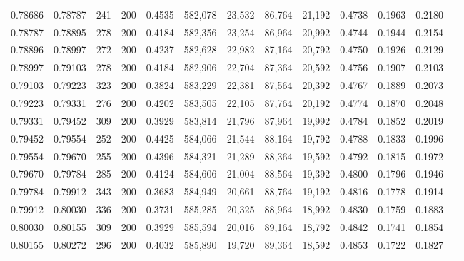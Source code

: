 \begin{tabular}{rrrrrrrrrrrrr}
0.78686 & 0.78787 &    241 & 200 &                                     0.4535 & 582,078 &  23,532 &  86,764 &  21,192 & 0.4738 & 0.1963 & 0.2180 \\
0.78787 & 0.78895 &    278 & 200 &                                     0.4184 & 582,356 &  23,254 &  86,964 &  20,992 & 0.4744 & 0.1944 & 0.2154 \\
0.78896 & 0.78997 &    272 & 200 &                                     0.4237 & 582,628 &  22,982 &  87,164 &  20,792 & 0.4750 & 0.1926 & 0.2129 \\
0.78997 & 0.79103 &    278 & 200 &                                     0.4184 & 582,906 &  22,704 &  87,364 &  20,592 & 0.4756 & 0.1907 & 0.2103 \\
0.79103 & 0.79223 &    323 & 200 &                                     0.3824 & 583,229 &  22,381 &  87,564 &  20,392 & 0.4767 & 0.1889 & 0.2073 \\
0.79223 & 0.79331 &    276 & 200 &                                     0.4202 & 583,505 &  22,105 &  87,764 &  20,192 & 0.4774 & 0.1870 & 0.2048 \\
0.79331 & 0.79452 &    309 & 200 &                                     0.3929 & 583,814 &  21,796 &  87,964 &  19,992 & 0.4784 & 0.1852 & 0.2019 \\
0.79452 & 0.79554 &    252 & 200 &                                     0.4425 & 584,066 &  21,544 &  88,164 &  19,792 & 0.4788 & 0.1833 & 0.1996 \\
0.79554 & 0.79670 &    255 & 200 &                                     0.4396 & 584,321 &  21,289 &  88,364 &  19,592 & 0.4792 & 0.1815 & 0.1972 \\
0.79670 & 0.79784 &    285 & 200 &                                     0.4124 & 584,606 &  21,004 &  88,564 &  19,392 & 0.4800 & 0.1796 & 0.1946 \\
0.79784 & 0.79912 &    343 & 200 &                                     0.3683 & 584,949 &  20,661 &  88,764 &  19,192 & 0.4816 & 0.1778 & 0.1914 \\
0.79912 & 0.80030 &    336 & 200 &                                     0.3731 & 585,285 &  20,325 &  88,964 &  18,992 & 0.4830 & 0.1759 & 0.1883 \\
0.80030 & 0.80155 &    309 & 200 &                                     0.3929 & 585,594 &  20,016 &  89,164 &  18,792 & 0.4842 & 0.1741 & 0.1854 \\
0.80155 & 0.80272 &    296 & 200 &                                     0.4032 & 585,890 &  19,720 &  89,364 &  18,592 & 0.4853 & 0.1722 & 0.1827 \\

\end{tabular}
